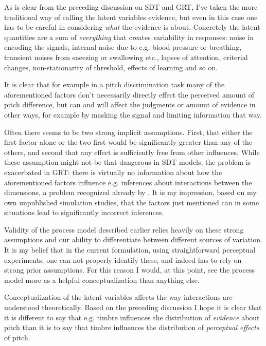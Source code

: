 \documentclass{article}\usepackage{knitr}
\begin{document}
As is clear from the preceding discussion on SDT and GRT, I've taken the more traditional way of calling the latent variables evidence, but even in this case one has to be careful in considering \textit{what} the evidence is about. Concretely the latent quantities are a sum of \textit{everything} that creates variability in responses: noise in encoding the signals, internal noise due to e.g. blood pressure or breathing, transient noises from sneezing or swallowing etc., lapses of attention, criterial changes, non-stationarity of threshold, effects of learning and so on. 

It is clear that for example in a pitch discrimination task many of the aforementioned factors don't necessarily directly effect the perceived amount of pitch difference, but can and will affect the judgments or amount of evidence in other ways, for example by masking the signal and limiting information that way.

Often there seems to be two strong implicit assumptions. First, that either the first factor alone or the two first would be significantly greater than any of the others, and second that any effect is sufficiently free from other influences. While these assumption might not be that dangerous in SDT models, the problem is exacerbated in GRT: there is virtually no information about how the aforementioned factors influence e.g. inferences about interactions between the dimensions, a problem recognized already by \citet{silbert2009}. It is my impression, based on my own unpublished simulation studies, that the factors just mentioned can in some situations lead to significantly incorrect inferences. 

Validity of the process model described earlier relies heavily on these strong assumptions and our ability to differentiate between different sources of variation. It is my belief that in the current formulation, using straightforward perceptual experiments, one can not properly identify these, and indeed has to rely on strong prior assumptions. For this reason I would, at this point, see the process model more as a helpful conceptualization than anything else.

Conceptualization of the latent variables affects the way interactions are understood theoretically. Based on the preceding discussion I hope it is clear that it is different to say that e.g. timbre influences the distribution of \textit{evidence} about pitch than it is to say that timbre influences the distribution of \textit{perceptual effects} of pitch.
\end{document}
